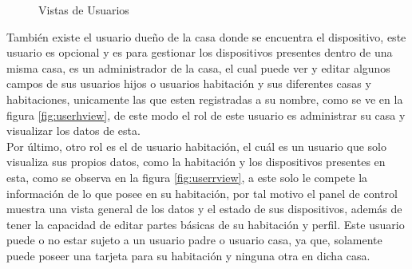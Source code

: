 \begin{figure}[H]
	\centering
	\caption{Vistas de Usuarios}
	\label{fig:views}
\end{figure}


También existe el usuario dueño de la casa donde se encuentra el dispositivo, este usuario es opcional y es para gestionar los dispositivos presentes dentro de una misma casa, es un administrador de la casa, el cual puede ver y editar algunos campos de sus usuarios hijos o usuarios habitación y sus diferentes casas y habitaciones, unicamente las que esten registradas a su nombre, como se ve en la figura \ref{fig:userhview}, de este modo el rol de este usuario es administrar su casa y visualizar los datos de esta.\\

Por último, otro rol es el de usuario habitación, el cuál es un usuario que solo visualiza sus propios datos, como la habitación y los dispositivos presentes en esta, como se observa en la figura \ref{fig:userrview}, a este solo le compete la información de lo que posee en su habitación, por tal motivo el panel de control muestra una vista general de los datos y el estado de sus dispositivos, además de tener la capacidad de editar partes básicas de su habitación y perfil. Este usuario puede o no estar sujeto a un usuario padre o usuario casa, ya que, solamente puede poseer una tarjeta para su habitación y ninguna otra en dicha casa.\\

